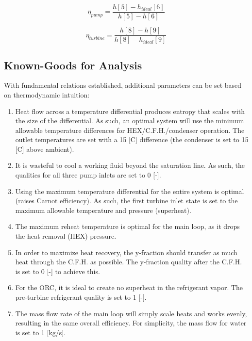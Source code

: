 \documentclass[10pt,cleanfoot]{asme2ej}
\begin{document}
\begin{equation}
\eta_{pump} = \frac{h[5] - h_{ideal}[6]}{h[5] - h[6]}
\label{Pump entropy}
\end{equation}

\begin{equation}
\eta_{turbine} = \frac{h[8] - h[9]}{h[8] - h_{ideal}[9]}
\label{Turbine entropy}
\end{equation}

\subsection{Known-Goods for Analysis}

With fundamental relations established, additional parameters can be set based on thermodynamic intuition:

\begin{enumerate}
\item
Heat flow across a temperature differential produces entropy that scales with the size of the differential. As such, an optimal system will use the minimum allowable temperature differences for HEX/C.F.H./condenser operation. The outlet temperatures are set with a 15 [C] difference (the condenser is set to 15 [C] above ambient).
\item
It is wasteful to cool a working fluid beyond the saturation line. As such, the qualities for all three pump inlets are set to 0 [-].
\item
Using the maximum temperature differential for the entire system is optimal (raises Carnot efficiency). As such, the first turbine inlet state is set to the maximum allowable temperature and pressure (superheat).
\item
The maximum reheat temperature is optimal for the main loop, as it drops the heat removal (HEX) pressure.
\item
In order to maximize heat recovery, the y-fraction should transfer as much heat through the C.F.H. as possible. The y-fraction quality after the C.F.H. is set to 0 [-] to achieve this.
\item
For the ORC, it is ideal to create no superheat in the refrigerant vapor. The pre-turbine refrigerant quality is set to 1 [-].
\item
The mass flow rate of the main loop will simply scale heats and works evenly, resulting in the same overall efficiency. For simplicity, the mass flow for water is set to 1 [kg/s].
\end{enumerate}
\end{document}
